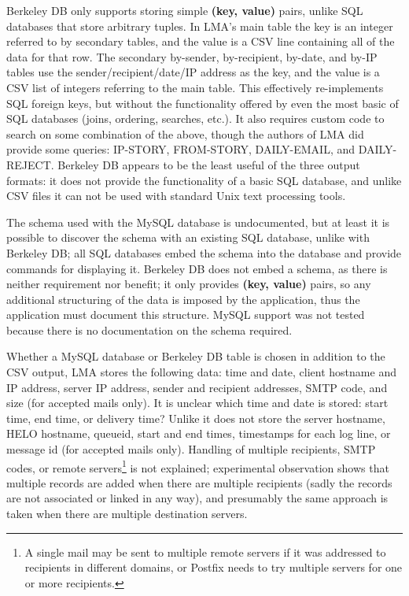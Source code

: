 Berkeley DB only supports storing simple \textbf{(key, value)} pairs,
unlike \gls{SQL} databases that store arbitrary tuples.  In \gls{LMA}'s
main table the key is an integer referred to by secondary tables, and the
value is a \gls{CSV} line containing all of the data for that row.  The
secondary by-sender, by-recipient, by-date, and by-\gls{IP} tables use the
sender/recipient/date/\gls{IP} address as the key, and the value is a
\gls{CSV} list of integers referring to the main table.  This effectively
re-implements \gls{SQL} foreign keys, but without the functionality offered
by even the most basic of \gls{SQL} databases (joins, ordering, searches,
etc.).  It also requires custom code to search on some combination of the
above, though the authors of \gls{LMA} did provide some queries: IP-STORY,
FROM-STORY, DAILY-EMAIL, and DAILY-REJECT\@.  Berkeley DB appears to be the
least useful of the three output formats: it does not provide the
functionality of a basic \gls{SQL} database, and unlike \gls{CSV} files it
can not be used with standard Unix text processing tools.

The schema used with the MySQL database is undocumented, but at least it is
possible to discover the schema with an existing \gls{SQL} database, unlike with
Berkeley DB\@; all \gls{SQL} databases embed the schema into the database
and provide commands for displaying it.  Berkeley DB does not embed a
schema, as there is neither requirement nor benefit; it only provides
\textbf{(key, value)} pairs, so any additional structuring of the data is
imposed by the application, thus the application must document this
structure.  MySQL support was not tested because there is no documentation
on the schema required.

Whether a MySQL database or Berkeley DB table is chosen in addition to the
\gls{CSV} output, \gls{LMA} stores the following data: time and date,
client hostname and \gls{IP} address, server \gls{IP} address, sender and
recipient addresses, \gls{SMTP} code, and size (for accepted mails only).
It is unclear which time and date is stored: start time, end time, or
delivery time?  Unlike \parsername{} it does not store the server hostname,
HELO hostname, queueid, start and end times, timestamps for each log line,
or message id (for accepted mails only).  Handling of multiple recipients,
\gls{SMTP} codes, or remote servers\footnote{A single mail may be sent to
multiple remote servers if it was addressed to recipients in different
domains, or Postfix needs to try multiple servers for one or more
recipients.} is not explained; experimental observation shows that multiple
records are added when there are multiple recipients (sadly the records are
not associated or linked in any way), and presumably the same approach is
taken when there are multiple destination servers.

